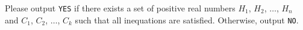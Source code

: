 Please output \verb|YES| if there exists a set of positive real numbers $H_1$, $H_2$, $\ldots$, $H_n$ and $C_1$, $C_2$, $\ldots$, $C_k$
such that all inequations are satisfied. Otherwise, output \verb|NO|.
